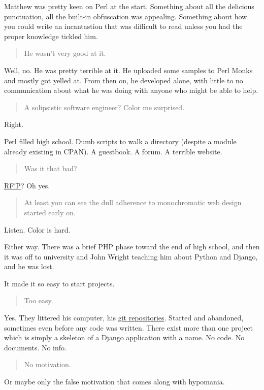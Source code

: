 Matthew was pretty keen on Perl at the start. Something about all the delicious punctuation, all the built-in obfuscation was appealing. Something about how you could write an incantastion that was difficult to read unless you had the proper knowledge tickled him.

\begin{quote}
He wasn't very good at it.
\end{quote}

Well, no. He was pretty terrible at it. He uploaded some samples to Perl Monks and mostly got yelled at. From then on, he developed alone, with little to no communication about what he was doing with anyone who might be able to help.

\begin{quote}
A solipsistic software engineer? Color me surprised.
\end{quote}

Right.

Perl filled high school. Dumb scripts to walk a directory (despite a module already existing in CPAN). A guestbook. A forum. A terrible website.

\begin{quote}
Was it that bad?
\end{quote}

\href{https://web.archive.org/web/20050202100148/http://ranna.babylonia.flatirons.org/}{RF!P}? Oh yes.

\begin{quote}
At least you can see the dull adherence to monochromatic web design started early on.
\end{quote}

Listen. Color is hard.

Either way. There was a brief PHP phase toward the end of high school, and then it was off to university and John Wright teaching him about Python and Django, and he was lost.

It made it so easy to start projects.

\begin{quote}
Too easy.
\end{quote}

Yes. They littered his computer, his \href{https://github.com/makyo-old/}{git repositories}. Started and abandoned, sometimes even before any code was written. There exist more than one project which is simply a skeleton of a Django application with a name. No code. No documents. No info.

\begin{quote}
No motivation.
\end{quote}

Or maybe only the false motivation that comes along with hypomania.
